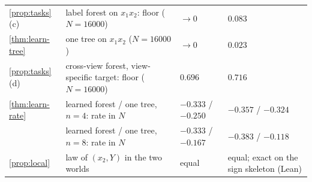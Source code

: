 \begin{tabular}{@{}llp{2.4cm}p{3.0cm}@{}}
\cref{prop:tasks}(c) & label forest on $x_1x_2$: floor ($N=16000$) & $\to0$ & $0.083$\\
\cref{thm:learn-tree} & one tree on $x_1x_2$ ($N=16000$) & $\to0$ & $0.023$\\
\cref{prop:tasks}(d) & cross-view forest, view-specific target: floor ($N=16000$) & $0.696$ & $0.716$\\
\cref{thm:learn-rate} & learned forest / one tree, $n=4$: rate in $N$ & $-0.333$ / $-0.250$ & $-0.357$ / $-0.324$\\
 & learned forest / one tree, $n=8$: rate in $N$ & $-0.333$ / $-0.167$ & $-0.383$ / $-0.118$\\
\cref{prop:local} & law of $(x_2,Y)$ in the two worlds & equal & equal; exact on the sign skeleton (Lean)\\
\bottomrule\end{tabular}